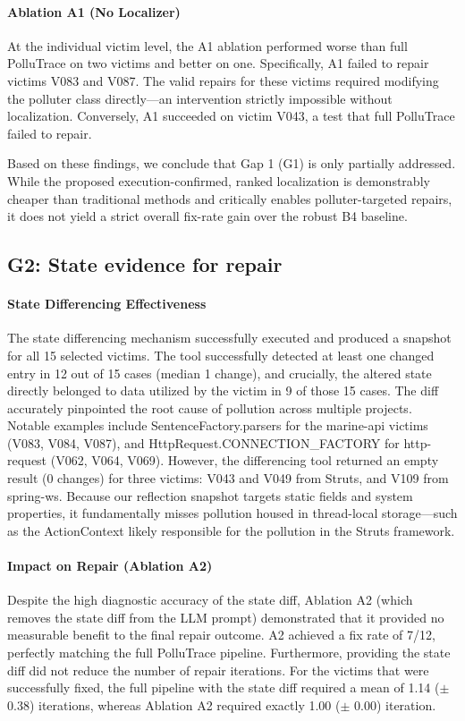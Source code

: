 \documentclass[conference]{IEEEtran}
\begin{document}
\paragraph{Ablation A1 (No Localizer)}
At the individual victim level, the A1 ablation performed worse than full PolluTrace on two victims and better on one. Specifically, A1 failed to repair victims V083 and V087. The valid repairs for these victims required modifying the polluter class directly—an intervention strictly impossible without localization. Conversely, A1 succeeded on victim V043, a test that full PolluTrace failed to repair.

Based on these findings, we conclude that Gap 1 (G1) is only partially addressed. While the proposed execution-confirmed, ranked localization is demonstrably cheaper than traditional methods and critically enables polluter-targeted repairs, it does not yield a strict overall fix-rate gain over the robust B4 baseline.

\subsection{G2: State evidence for repair}

\paragraph{State Differencing Effectiveness} 
The state differencing mechanism successfully executed and produced a snapshot for all 15 selected victims. The tool successfully detected at least one changed entry in 12 out of 15 cases (median 1 change), and crucially, the altered state directly belonged to data utilized by the victim in 9 of those 15 cases. The diff accurately pinpointed the root cause of pollution across multiple projects. Notable examples include SentenceFactory.parsers for the marine-api victims (V083, V084, V087), and HttpRequest.CONNECTION\_FACTORY for http-request (V062, V064, V069). However, the differencing tool returned an empty result (0 changes) for three victims: V043 and V049 from Struts, and V109 from spring-ws. Because our reflection snapshot targets static fields and system properties, it fundamentally misses pollution housed in thread-local storage—such as the ActionContext likely responsible for the pollution in the Struts framework.

\paragraph{Impact on Repair (Ablation A2)} 
Despite the high diagnostic accuracy of the state diff, Ablation A2 (which removes the state diff from the LLM prompt) demonstrated that it provided no measurable benefit to the final repair outcome. A2 achieved a fix rate of 7/12, perfectly matching the full PolluTrace pipeline. Furthermore, providing the state diff did not reduce the number of repair iterations. For the victims that were successfully fixed, the full pipeline with the state diff required a mean of 1.14 ($\pm$ 0.38) iterations, whereas Ablation A2 required exactly 1.00 ($\pm$ 0.00) iteration.
\end{document}

